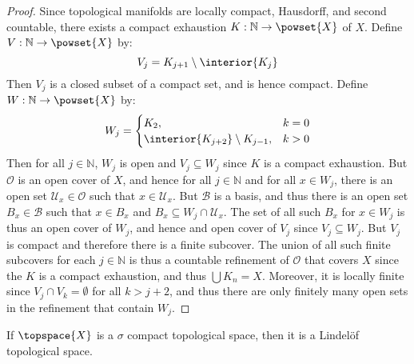             \begin{proof}
                Since topological manifolds are locally compact, Hausdorff, and
                second countable, there exists a compact exhaustion
                $K:\mathbb{N}\rightarrow\powset{X}$ of $X$. Define
                $V:\mathbb{N}\rightarrow\powset{X}$ by:
                \begin{equation}
                    V_{j}=K_{j+1}\setminus\interior{K_{j}}
                \end{equation}
                Then $V_{j}$ is a closed subset of a compact set, and is hence
                compact. Define $W:\mathbb{N}\rightarrow\powset{X}$ by:
                \begin{equation}
                    W_{j}=
                    \begin{cases}
                        K_{2},&k=0\\
                        \interior{K_{j+2}}\setminus{K}_{j-1},&k>0
                    \end{cases}
                \end{equation}
                Then for all $j\in\mathbb{N}$, $W_{j}$ is open and
                $V_{j}\subseteq{W}_{j}$ since $K$ is a compact exhaustion. But
                $\mathcal{O}$ is an open cover of $X$, and hence for all
                $j\in\mathbb{N}$ and for all $x\in{W}_{j}$, there is an open
                set $\mathcal{U}_{x}\in\mathcal{O}$ such that
                $x\in\mathcal{U}_{x}$. But $\mathcal{B}$ is a basis, and thus
                there is an open set $B_{x}\in\mathcal{B}$ such that
                $x\in{B}_{x}$ and $B_{x}\subseteq{W}_{j}\cap\mathcal{U}_{x}$.
                The set of all such $B_{x}$ for $x\in{W}_{j}$ is thus an open
                cover of $W_{j}$, and hence and open cover of $V_{j}$ since
                $V_{j}\subseteq{W}_{j}$. But $V_{j}$ is compact and therefore
                there is a finite subcover. The union of all such finite
                subcovers for each $j\in\mathbb{N}$ is thus a countable
                refinement of $\mathcal{O}$ that covers $X$ since the $K$ is a
                compact exhaustion, and thus $\bigcup{K}_{n}=X$. Moreover, it is
                locally finite since $V_{j}\cap{V}_{k}=\emptyset$ for all
                $k>j+2$, and thus there are only finitely many open sets in the
                refinement that contain $W_{j}$.
            \end{proof}
            \begin{theorem}
                If $\topspace{X}$ is a $\sigma$ compact topological space, then
                it is a Lindel\"{o}f topological space.
            \end{theorem}
